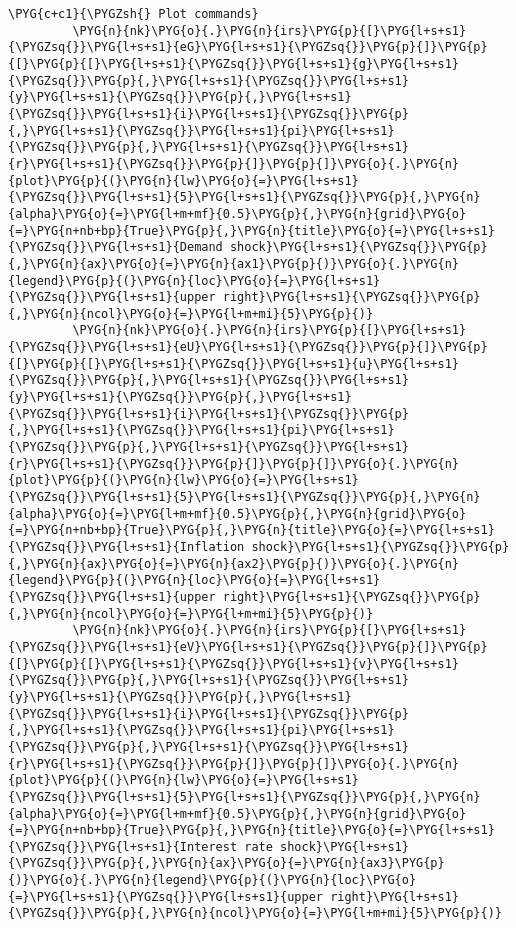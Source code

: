 \documentclass[letterpaper,10pt,openany,oneside,english]{sphinxmanual}
\begin{document}
\begin{Verbatim}[commandchars=\\\{\}]
         \PYG{c+c1}{\PYGZsh{} Plot commands}
         \PYG{n}{nk}\PYG{o}{.}\PYG{n}{irs}\PYG{p}{[}\PYG{l+s+s1}{\PYGZsq{}}\PYG{l+s+s1}{eG}\PYG{l+s+s1}{\PYGZsq{}}\PYG{p}{]}\PYG{p}{[}\PYG{p}{[}\PYG{l+s+s1}{\PYGZsq{}}\PYG{l+s+s1}{g}\PYG{l+s+s1}{\PYGZsq{}}\PYG{p}{,}\PYG{l+s+s1}{\PYGZsq{}}\PYG{l+s+s1}{y}\PYG{l+s+s1}{\PYGZsq{}}\PYG{p}{,}\PYG{l+s+s1}{\PYGZsq{}}\PYG{l+s+s1}{i}\PYG{l+s+s1}{\PYGZsq{}}\PYG{p}{,}\PYG{l+s+s1}{\PYGZsq{}}\PYG{l+s+s1}{pi}\PYG{l+s+s1}{\PYGZsq{}}\PYG{p}{,}\PYG{l+s+s1}{\PYGZsq{}}\PYG{l+s+s1}{r}\PYG{l+s+s1}{\PYGZsq{}}\PYG{p}{]}\PYG{p}{]}\PYG{o}{.}\PYG{n}{plot}\PYG{p}{(}\PYG{n}{lw}\PYG{o}{=}\PYG{l+s+s1}{\PYGZsq{}}\PYG{l+s+s1}{5}\PYG{l+s+s1}{\PYGZsq{}}\PYG{p}{,}\PYG{n}{alpha}\PYG{o}{=}\PYG{l+m+mf}{0.5}\PYG{p}{,}\PYG{n}{grid}\PYG{o}{=}\PYG{n+nb+bp}{True}\PYG{p}{,}\PYG{n}{title}\PYG{o}{=}\PYG{l+s+s1}{\PYGZsq{}}\PYG{l+s+s1}{Demand shock}\PYG{l+s+s1}{\PYGZsq{}}\PYG{p}{,}\PYG{n}{ax}\PYG{o}{=}\PYG{n}{ax1}\PYG{p}{)}\PYG{o}{.}\PYG{n}{legend}\PYG{p}{(}\PYG{n}{loc}\PYG{o}{=}\PYG{l+s+s1}{\PYGZsq{}}\PYG{l+s+s1}{upper right}\PYG{l+s+s1}{\PYGZsq{}}\PYG{p}{,}\PYG{n}{ncol}\PYG{o}{=}\PYG{l+m+mi}{5}\PYG{p}{)}
         \PYG{n}{nk}\PYG{o}{.}\PYG{n}{irs}\PYG{p}{[}\PYG{l+s+s1}{\PYGZsq{}}\PYG{l+s+s1}{eU}\PYG{l+s+s1}{\PYGZsq{}}\PYG{p}{]}\PYG{p}{[}\PYG{p}{[}\PYG{l+s+s1}{\PYGZsq{}}\PYG{l+s+s1}{u}\PYG{l+s+s1}{\PYGZsq{}}\PYG{p}{,}\PYG{l+s+s1}{\PYGZsq{}}\PYG{l+s+s1}{y}\PYG{l+s+s1}{\PYGZsq{}}\PYG{p}{,}\PYG{l+s+s1}{\PYGZsq{}}\PYG{l+s+s1}{i}\PYG{l+s+s1}{\PYGZsq{}}\PYG{p}{,}\PYG{l+s+s1}{\PYGZsq{}}\PYG{l+s+s1}{pi}\PYG{l+s+s1}{\PYGZsq{}}\PYG{p}{,}\PYG{l+s+s1}{\PYGZsq{}}\PYG{l+s+s1}{r}\PYG{l+s+s1}{\PYGZsq{}}\PYG{p}{]}\PYG{p}{]}\PYG{o}{.}\PYG{n}{plot}\PYG{p}{(}\PYG{n}{lw}\PYG{o}{=}\PYG{l+s+s1}{\PYGZsq{}}\PYG{l+s+s1}{5}\PYG{l+s+s1}{\PYGZsq{}}\PYG{p}{,}\PYG{n}{alpha}\PYG{o}{=}\PYG{l+m+mf}{0.5}\PYG{p}{,}\PYG{n}{grid}\PYG{o}{=}\PYG{n+nb+bp}{True}\PYG{p}{,}\PYG{n}{title}\PYG{o}{=}\PYG{l+s+s1}{\PYGZsq{}}\PYG{l+s+s1}{Inflation shock}\PYG{l+s+s1}{\PYGZsq{}}\PYG{p}{,}\PYG{n}{ax}\PYG{o}{=}\PYG{n}{ax2}\PYG{p}{)}\PYG{o}{.}\PYG{n}{legend}\PYG{p}{(}\PYG{n}{loc}\PYG{o}{=}\PYG{l+s+s1}{\PYGZsq{}}\PYG{l+s+s1}{upper right}\PYG{l+s+s1}{\PYGZsq{}}\PYG{p}{,}\PYG{n}{ncol}\PYG{o}{=}\PYG{l+m+mi}{5}\PYG{p}{)}
         \PYG{n}{nk}\PYG{o}{.}\PYG{n}{irs}\PYG{p}{[}\PYG{l+s+s1}{\PYGZsq{}}\PYG{l+s+s1}{eV}\PYG{l+s+s1}{\PYGZsq{}}\PYG{p}{]}\PYG{p}{[}\PYG{p}{[}\PYG{l+s+s1}{\PYGZsq{}}\PYG{l+s+s1}{v}\PYG{l+s+s1}{\PYGZsq{}}\PYG{p}{,}\PYG{l+s+s1}{\PYGZsq{}}\PYG{l+s+s1}{y}\PYG{l+s+s1}{\PYGZsq{}}\PYG{p}{,}\PYG{l+s+s1}{\PYGZsq{}}\PYG{l+s+s1}{i}\PYG{l+s+s1}{\PYGZsq{}}\PYG{p}{,}\PYG{l+s+s1}{\PYGZsq{}}\PYG{l+s+s1}{pi}\PYG{l+s+s1}{\PYGZsq{}}\PYG{p}{,}\PYG{l+s+s1}{\PYGZsq{}}\PYG{l+s+s1}{r}\PYG{l+s+s1}{\PYGZsq{}}\PYG{p}{]}\PYG{p}{]}\PYG{o}{.}\PYG{n}{plot}\PYG{p}{(}\PYG{n}{lw}\PYG{o}{=}\PYG{l+s+s1}{\PYGZsq{}}\PYG{l+s+s1}{5}\PYG{l+s+s1}{\PYGZsq{}}\PYG{p}{,}\PYG{n}{alpha}\PYG{o}{=}\PYG{l+m+mf}{0.5}\PYG{p}{,}\PYG{n}{grid}\PYG{o}{=}\PYG{n+nb+bp}{True}\PYG{p}{,}\PYG{n}{title}\PYG{o}{=}\PYG{l+s+s1}{\PYGZsq{}}\PYG{l+s+s1}{Interest rate shock}\PYG{l+s+s1}{\PYGZsq{}}\PYG{p}{,}\PYG{n}{ax}\PYG{o}{=}\PYG{n}{ax3}\PYG{p}{)}\PYG{o}{.}\PYG{n}{legend}\PYG{p}{(}\PYG{n}{loc}\PYG{o}{=}\PYG{l+s+s1}{\PYGZsq{}}\PYG{l+s+s1}{upper right}\PYG{l+s+s1}{\PYGZsq{}}\PYG{p}{,}\PYG{n}{ncol}\PYG{o}{=}\PYG{l+m+mi}{5}\PYG{p}{)}

\end{Verbatim}
\end{document}
